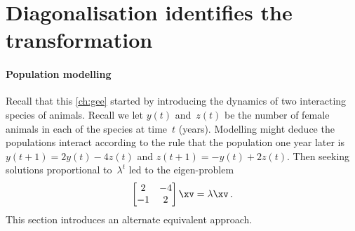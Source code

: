 

\section{Diagonalisation identifies the transformation}
\label{sec:dit}

\secttoc
\begin{comment}
\pooliv{\S4.4} \layiv{\S5.3} \holti{\S6.4} \cite[\S09]{Davis99a}
\end{comment}


\paragraph{Population modelling} 
Recall that this \autoref{ch:gee} started by introducing the dynamics of two interacting species of animals.
Recall we let \(y(t)\) and~\(z(t)\) be the number of female animals in each of the species at time~\(t\) (years). 
Modelling might deduce the populations interact according to the rule that the population one year later is \(y(t+1)=2y(t)-4z(t)\) and \(z(t+1)=-y(t)+2z(t)\).
Then seeking solutions proportional to~\(\lambda^t\) led to the eigen-problem
\begin{equation*}
\begin{bmatrix} 2&-4\\-1&2 \end{bmatrix}\xv=\lambda\xv\,.
\end{equation*}
This section introduces an alternate equivalent approach.

